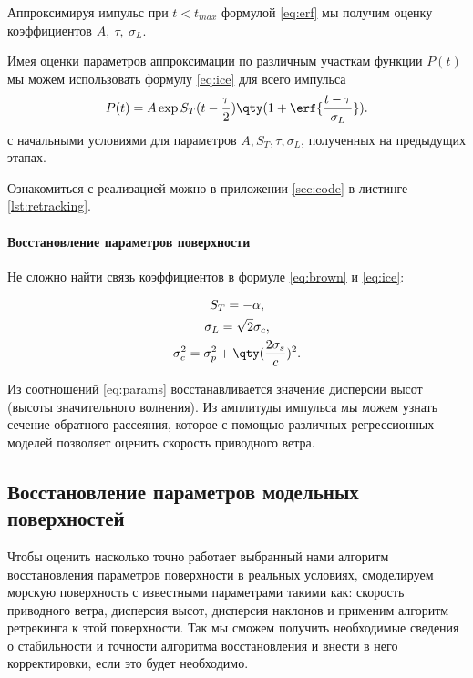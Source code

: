 Аппроксимируя импульс при $t<t_{max}$ формулой \eqref{eq:erf} мы получим оценку
коэффициентов $A,~\tau,~\sigma_L$. 


 Имея оценки параметров аппроксимации по различным
участкам функции $P(t)$ мы можем использовать формулу  \eqref{eq:ice} для всего
импульса 
\begin{equation}
    P(t) = A \exp{ S_T (t - \frac{\tau}{2})} \qty(1 + \erf{\frac{t-
    \tau}{\sigma_L}}).
\end{equation}
с начальными условиями для параметров $A, S_T, \tau, \sigma_L$, полученных на
предыдущих этапах. 



Ознакомиться с реализацией можно в приложении  \ref{sec:code} в листинге \ref{lst:retracking}. 




\paragraph{Восстановление параметров поверхности}%
Не сложно найти связь коэффициентов в формуле \eqref{eq:brown} и \eqref{eq:ice}:

\begin{equation}
    \label{eq:params}
    \begin{gathered}
        S_T = - \alpha,\\
        \sigma_L = \sqrt 2 \sigma_c,\\
        \sigma_c^2 = \sigma_p^2 + \qty(\frac{2\sigma_s}{c})^2.
    \end{gathered}
\end{equation}

Из соотношений \eqref{eq:params} восстанавливается значение дисперсии высот
(высоты значительного  волнения). 
Из амплитуды импульса мы можем узнать сечение обратного рассеяния, которое с
помощью различных регрессионных моделей позволяет оценить скорость приводного ветра.

\subsection{Восстановление параметров модельных поверхностей}
\label{sub:retracking_model}

Чтобы оценить насколько точно работает выбранный нами алгоритм восстановления
параметров поверхности в реальных условиях, смоделируем морскую поверхность с
известными параметрами такими как: скорость приводного ветра, дисперсия высот,
дисперсия наклонов и применим алгоритм ретрекинга к этой поверхности. Так мы
сможем получить необходимые сведения о стабильности и точности алгоритма
восстановления и внести в него корректировки, если это будет необходимо.

